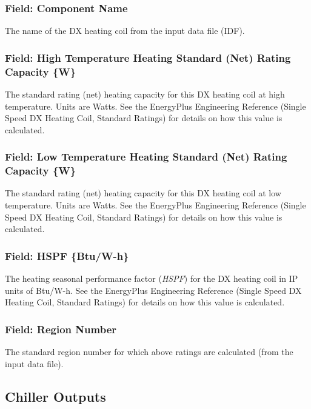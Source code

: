 \subsubsection{Field: Component Name}\label{field-component-name-7}

The name of the DX heating coil from the input data file (IDF).

\subsubsection{Field: High Temperature Heating Standard (Net) Rating Capacity \{W\}}\label{field-high-temperature-heating-standard-net-rating-capacity-w}

The standard rating (net) heating capacity for this DX heating coil at high temperature. Units are Watts. See the EnergyPlus Engineering Reference (Single Speed DX Heating Coil, Standard Ratings) for details on how this value is calculated.

\subsubsection{Field: Low Temperature Heating Standard (Net) Rating Capacity \{W\}}\label{field-low-temperature-heating-standard-net-rating-capacity-w}

The standard rating (net) heating capacity for this DX heating coil at low temperature. Units are Watts. See the EnergyPlus Engineering Reference (Single Speed DX Heating Coil, Standard Ratings) for details on how this value is calculated.

\subsubsection{Field: HSPF \{Btu/W-h\}}\label{field-hspf-btuw-h}

The heating seasonal performance factor (\emph{HSPF}) for the DX heating coil in IP units of Btu/W-h. See the EnergyPlus Engineering Reference (Single Speed DX Heating Coil, Standard Ratings) for details on how this value is calculated.

\subsubsection{Field: Region Number}\label{field-region-number}

The standard region number for which above ratings are calculated (from the input data file).

\subsection{Chiller Outputs}\label{chiller-outputs}

